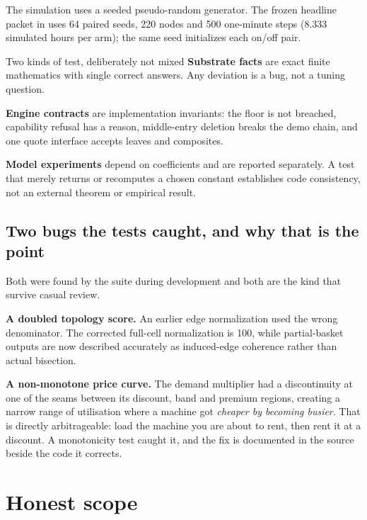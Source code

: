 \documentclass[11pt,letterpaper]{article}
\begin{document}
The simulation uses a seeded pseudo-random generator. The frozen headline
packet in  uses 64 paired seeds, 220 nodes
and 500 one-minute steps (8.333 simulated hours per arm); the same seed
initializes each on/off pair.

\begin{keybox}{Two kinds of test, deliberately not mixed}
\textbf{Substrate facts} are exact finite mathematics with single correct
answers. Any deviation is a bug, not a tuning question.

\vspace{4pt}
\textbf{Engine contracts} are implementation invariants: the floor is not
breached, capability refusal has a reason, middle-entry deletion breaks the
demo chain, and one quote interface accepts leaves and composites.

\vspace{4pt}
\textbf{Model experiments} depend on coefficients and are reported separately.
A test that merely returns or recomputes a chosen constant establishes code
consistency, not an external theorem or empirical result.
\end{keybox}

\subsection{Two bugs the tests caught, and why that is the point}

Both were found by the suite during development and both are the kind that
survive casual review.

\textbf{A doubled topology score.} An earlier edge normalization used the wrong
denominator. The corrected full-cell normalization is 100, while partial-basket
outputs are now described accurately as induced-edge coherence rather than
actual bisection.

\textbf{A non-monotone price curve.} The demand multiplier had a discontinuity
at one of the seams between its discount, band and premium regions, creating a
narrow range of utilisation where a machine got \emph{cheaper by becoming
busier}. That is directly arbitrageable: load the machine you are about to
rent, then rent it at a discount. A monotonicity test caught it, and the fix is
documented in the source beside the code it corrects.

\newpage

\section{Honest scope}
\end{document}

